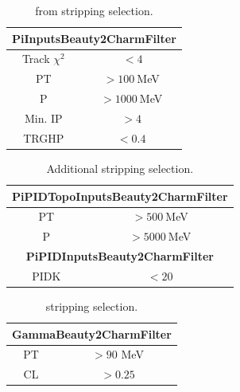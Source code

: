 \vspace{1ex}
\begin{table}[h!]
\centering
\begin{tabular}{|c|c|} \hline
\multicolumn{2}{|c|}{\bf{PiInputsBeauty2CharmFilter}}\\ \hline
Track $\chi^2$ & $\ < 4$ \\ \hline
PT & $ > 100\ $MeV \\ \hline
P & $ > 1000 \ $MeV \\ \hline
Min. IP & $ > 4$ \\ \hline
TRGHP & $ < 0.4$ \\ \hline
\end{tabular}
\caption{\pion from \Ds stripping selection.}
\end{table}


\vspace{1ex}
\begin{table}[h!]
\centering
\begin{tabular}{|c|c|} \hline
\multicolumn{2}{|c|}{\bf{PiPIDTopoInputsBeauty2CharmFilter}}\\ \hline
PT & $ > 500\ $MeV \\ \hline
P & $ > 5000 \ $MeV \\ \hline
\multicolumn{2}{|c|}{\bf{PiPIDInputsBeauty2CharmFilter}}\\ \hline
PIDK & $ < 20$ \\ \hline
\end{tabular}
\caption{Additional \pion stripping selection.}
\label{tab:stripp_3}
\end{table}

\vspace{1ex}
\begin{table}[h!]
\centering
\begin{tabular}{|c|c|} \hline
\multicolumn{2}{|c|}{\bf{GammaBeauty2CharmFilter}}\\ \hline
PT & $\ > 90$ MeV \\ \hline
CL & $\ > 0.25$ \\ \hline
\end{tabular}
\caption{\g stripping selection.}
\label{tab:stripp_4}
\end{table}


